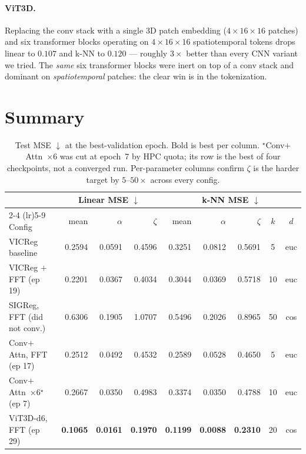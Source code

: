 \documentclass[11pt]{article}
\begin{document}
\paragraph{ViT3D.}
Replacing the conv stack with a single 3D patch embedding
($4{\times}16{\times}16$ patches) and six transformer blocks operating on
$4{\times}16{\times}16$ spatiotemporal tokens drops linear to
$\mathbf{0.107}$ and k-NN to $\mathbf{0.120}$ — roughly $3\times$ better
than every CNN variant we tried. The \emph{same} six transformer blocks
were inert on top of a conv stack and dominant on \emph{spatiotemporal}
patches: the clear win is in the tokenization.

\section{Summary}

\begin{table}[h]
  \centering
  \small
  \setlength{\tabcolsep}{4pt}
  \begin{tabular}{lrrrrrrcc}
    \toprule
    & \multicolumn{3}{c}{Linear MSE $\downarrow$} & \multicolumn{5}{c}{k-NN MSE $\downarrow$} \\
    \cmidrule(lr){2-4} \cmidrule(lr){5-9}
    Config & mean & $\alpha$ & $\zeta$ & mean & $\alpha$ & $\zeta$ & $k$ & $d$ \\
    \midrule
    VICReg baseline                  & 0.2594 & 0.0591 & 0.4596 & 0.3251 & 0.0812 & 0.5691 & 5  & euc \\
    VICReg $+$ FFT (ep 19)           & 0.2201 & 0.0367 & 0.4034 & 0.3044 & 0.0369 & 0.5718 & 10 & euc \\
    SIGReg, FFT (did not conv.)      & 0.6306 & 0.1905 & 1.0707 & 0.5496 & 0.2026 & 0.8965 & 50 & cos \\
    Conv$+$Attn, FFT (ep 17)         & 0.2512 & 0.0492 & 0.4532 & 0.2589 & 0.0528 & 0.4650 & 5  & euc \\
    Conv$+$Attn~$\times$6$^{\star}$ (ep 7) & 0.2667 & 0.0350 & 0.4983 & 0.3374 & 0.0350 & 0.4788 & 10 & euc \\
    ViT3D-d6, FFT (ep 29)            & \textbf{0.1065} & \textbf{0.0161} & \textbf{0.1970} & \textbf{0.1199} & \textbf{0.0088} & \textbf{0.2310} & 20 & cos \\
    \bottomrule
  \end{tabular}
  \caption{Test MSE $\downarrow$ at the best-validation epoch. Bold
    is best per column. $^{\star}$Conv$+$Attn~$\times$6 was cut at
    epoch~7 by HPC quota; its row is the best of four checkpoints, not a
    converged run. Per-parameter columns confirm $\zeta$ is the harder
    target by $5$--$50\times$ across every config.}
  \label{tab:summary}
\end{table}
\end{document}
